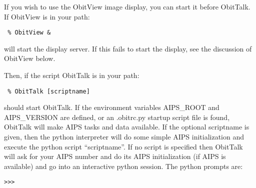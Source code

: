 \documentclass[11pt]{report}
\begin{document}
If you wish to use the ObitView image display, you can start it before
ObitTalk.
If ObitView is in your path:
\begin{verbatim}
 % ObitView &
\end{verbatim}
will start the display server.
If this fails to start the display, see the discussion of ObitView below.

Then, if the script ObitTalk is in your path:
\begin{verbatim}
 % ObitTalk [scriptname]
\end{verbatim}
should start ObitTalk.
If the environment variables AIPS\_ROOT and AIPS\_VERSION are
defined, or an .obitrc.py startup script file is found, ObitTalk will
make AIPS tasks and data available. 
If the optional scriptname is given, then the python interpreter will
do some simple AIPS initialization and execute the python script
``scriptname''. 
If no script is specified then ObitTalk will ask for your AIPS number
and do its AIPS initialization (if AIPS is available) and go into an
interactive python session.
The python prompts are: \begin{verbatim}>>> \end{verbatim}
\end{document}
